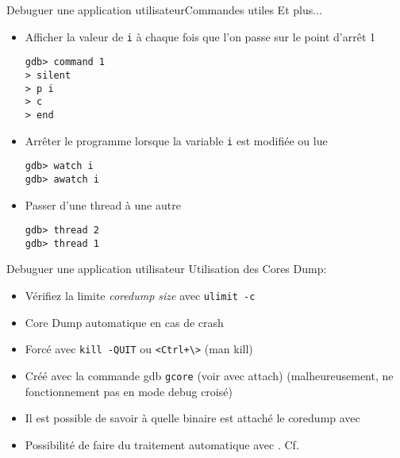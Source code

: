 \begin{frame}[fragile=singleslide]{Debuguer une application utilisateur}{Commandes utiles}
  Et plus...
  \begin{itemize}
  \item Afficher  la valeur de \verb+i+  à chaque fois  que l'on passe
    sur le point d'arrêt 1
    \begin{lstlisting}
gdb> command 1
> silent
> p i
> c
> end
    \end{lstlisting}
  \item Arrêter le programme lorsque la variable \verb+i+ est modifiée
    ou lue
    \begin{lstlisting}
gdb> watch i
gdb> awatch i
      \end{lstlisting}
    \item Passer d'une thread à une autre
      \begin{lstlisting}
gdb> thread 2
gdb> thread 1
      \end{lstlisting}
    \end{itemize}
\end{frame}

\begin{frame}[fragile=singleslide]{Debuguer une application utilisateur}
  Utilisation des Cores Dump:
  \begin{itemize}
  \item Vérifiez la limite \emph{coredump size} avec \texttt{ulimit -c}
  \item Core Dump automatique en cas de crash
  \item Forcé avec \texttt{kill -QUIT} ou \verb|<Ctrl+\>| (man kill)
  \item Créé  avec la commande  gdb \texttt{gcore} (voir  avec attach)
    (malheureusement, ne fonctionnement pas en mode debug croisé)
  \item  Il est possible  de savoir  à quelle  binaire est  attaché le
    coredump avec 
  \item Possibilité de faire du traitement automatique avec
    . Cf.
  \end{itemize}
\end{frame}

